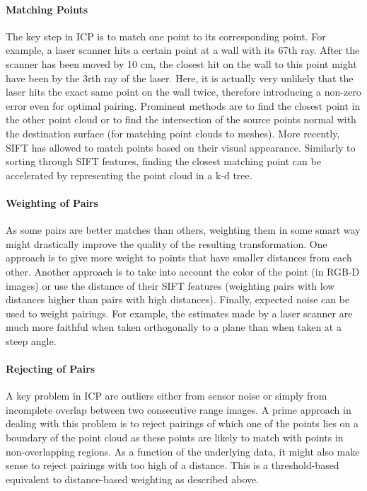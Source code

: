 \paragraph{Matching Points}
The key step in ICP is to match one point to its corresponding point.  For example, a laser scanner hits a certain point at a wall with its 67th ray. After the scanner has been moved by 10 cm, the closest hit on the wall to this point might have been by the 3rth ray of the laser. Here, it is actually very unlikely that the laser hits the exact same point on the wall twice, therefore introducing a non-zero error even for optimal pairing. Prominent methods are to find the closest point in the other point cloud or to find the intersection of the source points normal with the destination surface (for matching point clouds to meshes). More recently, SIFT has allowed to match points based on their visual appearance. Similarly to sorting through SIFT features, finding the closest matching point can be accelerated by representing the point cloud in a k-d tree.

\paragraph{Weighting of Pairs}
As some pairs are better matches than others, weighting them in some smart way might drastically improve the quality of the resulting transformation. One approach is to give more weight to points that have smaller distances from each other. Another approach is to take into account the color of the point (in RGB-D images) or use the distance of their SIFT features (weighting pairs with low distances higher than pairs with high distances). Finally, expected noise can be used to weight pairings. For example, the estimates made by a laser scanner are much more faithful when taken orthogonally to a plane than when taken at a steep angle.

\paragraph{Rejecting of Pairs}
A key problem in ICP are outliers either from sensor noise or simply from incomplete overlap between two consecutive range images. A prime approach in dealing with this problem is to reject pairings of which one of the points lies on a boundary of the point cloud as these points are likely to match with points in non-overlapping regions. As a function of the underlying data, it might also make sense to reject pairings with too high of a distance. This is a threshold-based equivalent to distance-based weighting as described above.

